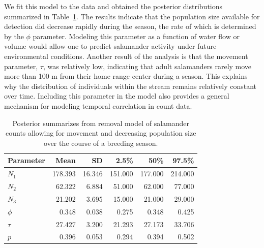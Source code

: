 We fit this model to the data and obtained the posterior distributions
summarized in Table~\ref{unmarked.tab.dusky}. The results indicate that
the population size available for detection did decrease
rapidly during the season, the rate of which is determined by the
$\phi$ parameter. Modeling this parameter as a function of water flow
or volume would allow one to predict salamander activity under future
environmental conditions.
Another result of the analysis is that the movement parameter, $\tau$,
was relatively low, indicating that adult salamanders rarely move more
than 100 m 
from their home range center during a season. This explains
why the distribution of individuals within the stream remains
relatively constant over time. Including this parameter in the model
also provides a general mechanism for modeling temporal correlation in
count data.

\begin{table}
  \centering
  \caption{Posterior summarizes from removal model of salamander
    counts allowing for movement and decreasing population size over
    the course of a breeding season.}
  \begin{tabular}{lrrrrr}
    \hline
    Parameter & Mean    & SD     & 2.5\%   & 50\%    & 97.5\%  \\
    \hline
    $N_1$     & 178.393 & 16.346 & 151.000 & 177.000 & 214.000 \\
    $N_2$     & 62.322  & 6.884  & 51.000  & 62.000  & 77.000  \\
    $N_3$     & 21.202  & 3.695  & 15.000  & 21.000  & 29.000  \\
    $\phi$    & 0.348   & 0.038  & 0.275   & 0.348   & 0.425   \\
    $\tau$    & 27.427  & 3.200  & 21.293  & 27.173  & 33.706  \\
    $p$       & 0.396   & 0.053  & 0.294   & 0.394   & 0.502   \\
    \hline
  \end{tabular}
  \label{unmarked.tab.dusky}
\end{table}


